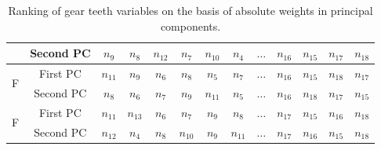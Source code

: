 \begin{table}[!ht]
\begin{tabular}{|c|c|c|c|c|c|c|c|c|c|c|c|c|}
    \cline{2-13}
    & Second PC & $n_{9}$ & $n_{8}$ & $n_{12}$ & $n_{7}$ & $n_{10}$ & $n_{4}$ & $\dots$ &  \cellcolor{magenta} $n_{16}$ & \cellcolor{green} $n_{15}$ & \cellcolor{cyan}$n_{17}$ & \cellcolor{orange} $n_{18}$ \\ 
    \hline
    \cline{1-13}
    \multirow{2}{*}{F}& First PC & $n_{11}$ & $n_{9}$ & $n_{6}$ & $n_{8}$ & $n_{5}$ & $n_{7}$ & $\dots$ &  \cellcolor{magenta} $n_{16}$ & \cellcolor{green} $n_{15}$ & \cellcolor{orange}$n_{18}$ & \cellcolor{cyan} $n_{17}$ \\ 
    \cline{2-13}
    & Second PC & $n_{8}$ & $n_{6}$ & $n_{7}$ & $n_{9}$ & $n_{11}$ & $n_{5}$ & $\dots$ &  \cellcolor{magenta} $n_{16}$ & \cellcolor{orange} $n_{18}$ & \cellcolor{cyan}$n_{17}$ & \cellcolor{green} $n_{15}$ \\ 
    \hline
    \cline{1-13}
    \multirow{2}{*}{F}& First PC & $n_{11}$ & $n_{13}$ & $n_{6}$ & $n_{7}$ & $n_{9}$ & $n_{8}$ & $\dots$ &  \cellcolor{cyan} $n_{17}$ & \cellcolor{green} $n_{15}$ & \cellcolor{magenta}$n_{16}$ & \cellcolor{orange} $n_{18}$ \\ 
    \cline{2-13}
    & Second PC & $n_{12}$ & $n_{4}$ & $n_{8}$ & $n_{10}$ & $n_{9}$ & $n_{11}$ & $\dots$ &  \cellcolor{cyan} $n_{17}$ & \cellcolor{magenta} $n_{16}$ & \cellcolor{green}$n_{15}$ & \cellcolor{orange} $n_{18}$ \\ 
    \hline
  \end{tabular}
  \caption{Ranking of gear teeth variables on the basis of absolute weights in principal components.}
  \label{first2gtvnt}
\end{table}



 